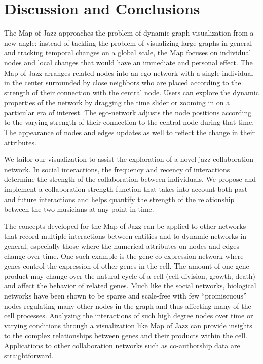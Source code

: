 \documentclass[12pt]{cmuthesis}
\begin{document}
\section{Discussion and Conclusions}

  The Map of Jazz approaches the problem of dynamic graph visualization from a new angle: instead of tackling the problem of visualizing large graphs in general and tracking temporal changes on a global scale, the Map focuses on individual nodes and local changes that would have an immediate and personal effect. The Map of Jazz arranges related nodes into an ego-network with a single individual in the center surrounded by close neighbors who are placed according to the strength of their connection with the central node. Users can explore the dynamic properties of the network by dragging the time slider or zooming in on a particular era of interest. The ego-network adjusts the node positions according to the varying strength of their connection to the central node during that time. The appearance of nodes and edges updates as well to reflect the change in their attributes.

  We tailor our visualization to assist the exploration of a novel jazz collaboration network. In social interactions, the frequency and recency of interactions determine the strength of the collaboration between individuals. We propose and implement a collaboration strength function that takes into account both past and future interactions and helps quantify the strength of the relationship between the two musicians at any point in time.

  The concepts developed for the Map of Jazz can be applied to other networks that record multiple interactions between entities and to dynamic networks in general, especially those where the numerical attributes on nodes and edges change over time. One such example is the gene co-expression network where genes control the expression of other genes in the cell. The amount of one gene product may change over the natural cycle of a cell (cell division, growth, death) and affect the behavior of related genes. 
  Much like the social networks, biological networks have been shown to be sparse and scale-free with few ``promiscuous'' nodes regulating many other nodes in the graph and thus affecting many of the cell processes. Analyzing the interactions of such high degree nodes over time or varying conditions through a visualization like Map of Jazz can provide insights to the complex relationships between genes and their products within the cell.
  Applications to other collaboration networks such as co-authorship data are straightforward.
  
\end{document}
